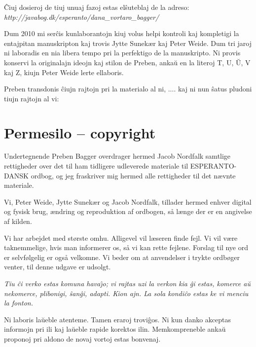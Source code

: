 {\frenchspacing
\^Ciuj dosieroj de tiuj unuaj fazoj estas el\^suteblaj de la adreso:\\
\textit{http://javabog.dk/esperanto/dana\_vortaro\_bagger/}}

{\frenchspacing
Dum 2010 mi ser\^cis kunlaborantojn kiuj volus helpi kontroli kaj
kompletigi la entajpitan manuskripton kaj trovis Jytte Sunek{\ae}r kaj
Peter Weide. Dum tri jaroj ni laboradis en nia libera tempo pri la
perfektigo de la manuskripto. Ni provis konservi la originalajn ideojn
kaj stilon de Preben, anka\u{u} en la literoj T, U, \u{U}, V kaj Z,
kiujn Peter Weide lerte ellaboris.}

{\frenchspacing
Preben transdonis \^ciujn rajtojn pri la materialo al ni, .... kaj ni
nun \^satus pludoni tiujn rajtojn al vi:}

\section{Permesilo -- copyright}
{
Undertegnende Preben Bagger overdrager hermed Jacob Nordfalk samtlige
rettigheder over det til ham tidligere udleverede materiale til
ESPERANTO-DANSK ordbog, og jeg fraskriver mig hermed alle rettigheder
til det n{\ae}vnte materiale.}

{
Vi, Peter Weide, Jytte Sunek{\ae}r og Jacob Nordfalk, tillader hermed
enhver digital og fysisk brug, {\ae}ndring og reproduktion af ordbogen,
s{\aa} l{\ae}nge der er en angivelse af kilden.}

{
Vi har arbejdet med st{\o}rste omhu. Alligevel vil l{\ae}seren finde
fejl. Vi vil v{\ae}re taknemmelige, hvis man informerer os, s{\aa} vi
kan rette fejlene. Forslag til nye ord er selvf{\o}lgelig er ogs{\aa}
velkomne. Vi beder om at anvendelser i trykte ordb{\o}ger venter, til
denne udgave er udsolgt.}

{\frenchspacing
\textit{Tiu \^ci verko estas komuna hava\^{\j}o; vi rajtas uzi la verkon
}\foreignlanguage{danish}{\textit{kia}}\textit{ \^gi estas, komerce
a\u{u} nekomerce, plibonigi, \^san\^gi, adapti. Kion ajn. La sola
kondi\^co estas ke vi menci}\textit{u}\textit{ la fonton.}}

{\frenchspacing
Ni laboris la\u{u}eble atenteme. Tamen eraroj trovi\^gos. Ni kun danko
akceptas informojn pri ili kaj la\u{u}eble rapide korektos ilin.
Memkompreneble anka\u{u} proponoj pri aldono de novaj vortoj estas
bonvenaj.}


